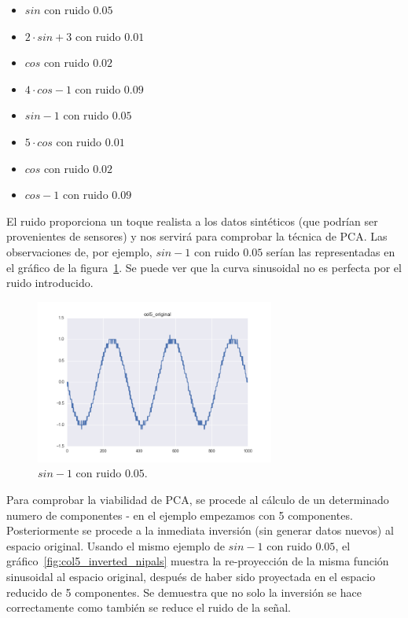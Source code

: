 \documentclass[11pt,spanish,listoffigures,listoftables]{tfgetsinf}
\begin{document}
    \begin{itemize}
        \item \(sin\) con ruido \(0.05\)
        \item \(2\cdot sin + 3\) con ruido \(0.01\)
        \item \(cos\) con ruido \(0.02\)
        \item \(4\cdot cos-1\) con ruido \(0.09\)
        \item \(sin - 1\) con ruido \(0.05\)
        \item \(5\cdot cos\) con ruido \(0.01\)
        \item \(cos\) con ruido \(0.02\)
        \item \(cos - 1\) con ruido \(0.09\)
    \end{itemize}
    
    El ruido proporciona un toque realista a los datos sintéticos (que podrían ser provenientes de sensores) y nos servirá para comprobar la técnica de PCA. Las observaciones de, por ejemplo, \(sin - 1\) con ruido \(0.05\) serían las representadas en el gráfico de la figura~\ref{fig:col5_original}. Se puede ver que la curva sinusoidal no es perfecta por el ruido introducido.
    
    \begin{figure}[H]
        \centering
        \includegraphics[width=0.7\textwidth]{simulated_data_8_columns/col5_original.png}
        \caption{\(sin - 1\) con ruido \(0.05\).}
        \label{fig:col5_original}
    \end{figure}

    Para comprobar la viabilidad de PCA, se procede al cálculo de un determinado numero de componentes - en el ejemplo empezamos con 5 componentes. Posteriormente se procede a la inmediata inversión (sin generar datos nuevos) al espacio original. Usando el mismo ejemplo de \(sin - 1\) con ruido \(0.05\), el gráfico~\ref{fig:col5_inverted_nipals} muestra la re-proyección de la misma función sinusoidal al espacio original, después de haber sido proyectada en el espacio reducido de 5 componentes. Se demuestra que no solo la inversión se hace correctamente como también se reduce el ruido de la señal.
\end{document}
